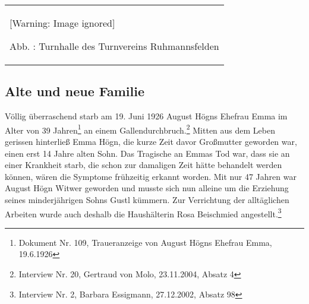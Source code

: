 \documentclass[a4paper]{article}
\newcounter{Abb}
\renewcommand\theAbb{\arabic{Abb}}
\begin{document}
\begin{center}
\begin{minipage}{9.684cm}
\begin{flushleft}
\tablefirsthead{}
\tablehead{}
\tabletail{}
\tablelasttail{}
\begin{supertabular}{m{9.484cm}}
  [Warning: Image ignored] %
 
Abb. \stepcounter{Abb}{\theAbb}: Turnhalle des Turnvereins
Ruhmannsfelden\\
\end{supertabular}
\end{flushleft}
\end{minipage}
\end{center}
\subsection{Alte und neue Familie}
\hypertarget{RefHeadingToc100333731}{}Völlig überraschend starb am 19.
Juni 1926 August Högns Ehefrau Emma im Alter von 39 Jahren\footnote{
Dokument Nr. 109, Traueranzeige von August Högns Ehefrau Emma,
19.6.1926} an einem Gallendurchbruch.\footnote{ Interview Nr. 20,
Gertraud von Molo, 23.11.2004, Absatz 4} Mitten aus dem Leben gerissen
hinterließ Emma Högn, die kurze Zeit davor Großmutter geworden war,
einen erst 14 Jahre alten Sohn. Das Tragische an Emmas Tod war, dass
sie an einer Krankheit starb, die schon zur damaligen Zeit hätte
behandelt werden können, wären die Symptome frühzeitig erkannt worden.
Mit nur 47 Jahren war August Högn Witwer geworden und musste sich nun
alleine um die Erziehung seines minderjährigen Sohns Gustl kümmern. Zur
Verrichtung der alltäglichen Arbeiten wurde auch deshalb die
Haushälterin Rosa Beischmied angestellt.\footnote{ Interview Nr. 2,
Barbara Essigmann, 27.12.2002, Absatz 98}
\end{document}
